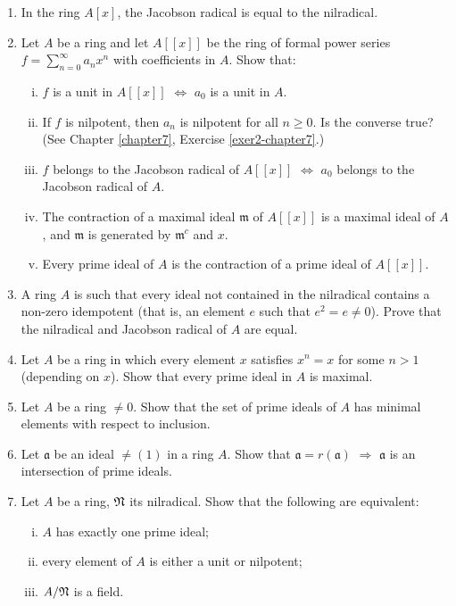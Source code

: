 \begin{enumerate}
    \item \label{exer4-chapter1}In the ring $A[x]$, the Jacobson radical is equal to the nilradical.

    \item \label{exer5-chapter1}Let $A$ be a ring and let $A[[x]]$ be the ring of formal power series $f = \sum_{n=0}^\infty a_n x^n$ with coefficients in $A$. Show that:
    \begin{enumerate}[i)]
        \item $f$ is a unit in $A[[x]]$ $\iff$ $a_0$ is a unit in $A$.
        \item If $f$ is nilpotent, then $a_n$ is nilpotent for all $n \geq 0$. Is the converse true? (See Chapter \ref{chapter7}, Exercise \ref{exer2-chapter7}.)
        \item $f$ belongs to the Jacobson radical of $A[[x]]$ $\iff$ $a_0$ belongs to the Jacobson radical of $A$.
        \item The contraction of a maximal ideal $\mathfrak{m}$ of $A[[x]]$ is a maximal ideal of $A$, and $\mathfrak{m}$ is generated by $\mathfrak{m}^c$ and $x$.
        \item Every prime ideal of $A$ is the contraction of a prime ideal of $A[[x]]$.
    \end{enumerate}

    \item \label{exer6-chapter1}A ring $A$ is such that every ideal not contained in the nilradical contains a non-zero idempotent (that is, an element $e$ such that $e^2 = e \neq 0$). Prove that the nilradical and Jacobson radical of $A$ are equal.

    \item \label{exer7-chapter1}Let $A$ be a ring in which every element $x$ satisfies $x^n = x$ for some $n > 1$ (depending on $x$). Show that every prime ideal in $A$ is maximal.

    \item \label{exer8-chapter1}Let $A$ be a ring $\neq 0$. Show that the set of prime ideals of $A$ has minimal elements with respect to inclusion.

    \item \label{exer9-chapter1}Let $\mathfrak{a}$ be an ideal $\neq (1)$ in a ring $A$. Show that $\mathfrak{a} = r(\mathfrak{a})$ $\Rightarrow$ $\mathfrak{a}$ is an intersection of prime ideals.

    \item \label{exer10-chapter1}Let $A$ be a ring, $\mathfrak{N}$ its nilradical. Show that the following are equivalent:
    \begin{enumerate}[i)]
        \item $A$ has exactly one prime ideal;
        \item every element of $A$ is either a unit or nilpotent;
        \item $A/\mathfrak{N}$ is a field.
    \end{enumerate}


\end{enumerate}
